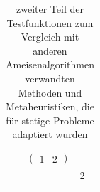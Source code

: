 \documentclass[fontsize=12, a4aper]{scrartcl}
\begin{document}
\begin{table}[H]
	
	\fontsize{10pt}{12pt}
	
	\caption{zweiter Teil der Testfunktionen zum Vergleich mit anderen Ameisenalgorithmen verwandten Methoden und Metaheuristiken, die für stetige Probleme adaptiert wurden}
	\label{schwereTestfunktionen}
	
	\begin{tabularx}{\textwidth}{r|l}
		
		\fontsize{10pt}{12pt}
		
		
		
		$\begin{pmatrix}
		1 & 2
		\end{pmatrix}$ & \\
		
		\(\begin{pmatrix}
		1 & 2
		\end{pmatrix}\)
		
	\end{tabularx}

\end{table}

\cite{kern2004learning}




\end{document}
